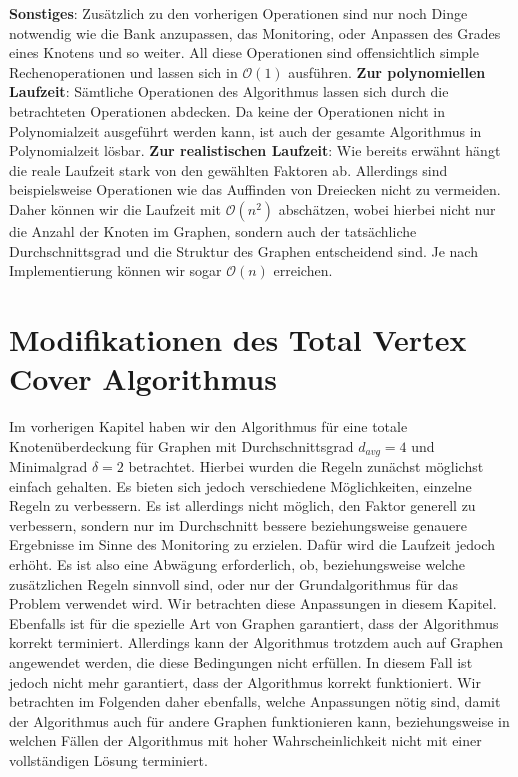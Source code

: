 \documentclass[12pt,onecolumn, notitlepage]{scrartcl}
\begin{document}
\textbf{Sonstiges}: Zusätzlich zu den vorherigen Operationen sind nur noch Dinge notwendig wie die Bank anzupassen, das Monitoring, oder Anpassen des Grades eines Knotens und so weiter. All diese Operationen sind offensichtlich simple Rechenoperationen und lassen sich in $\mathcal O(1)$ ausführen.\newline \newline
\textbf{Zur polynomiellen Laufzeit}: Sämtliche Operationen des Algorithmus lassen sich durch die betrachteten Operationen abdecken. Da keine der Operationen nicht in Polynomialzeit ausgeführt werden kann, ist auch der gesamte Algorithmus in Polynomialzeit lösbar. \newline
\textbf{Zur realistischen Laufzeit}: Wie bereits erwähnt hängt die reale Laufzeit stark von den gewählten Faktoren ab. Allerdings sind beispielsweise Operationen wie das Auffinden von Dreiecken nicht zu vermeiden. Daher können wir die Laufzeit mit $\mathcal O(n^2)$ abschätzen, wobei hierbei nicht nur die Anzahl der Knoten im Graphen, sondern auch der tatsächliche Durchschnittsgrad und die Struktur des Graphen entscheidend sind. Je nach Implementierung können wir sogar $\mathcal O(n)$ erreichen. \newline
\section{Modifikationen des Total Vertex Cover Algorithmus}\label{sec:Op}
Im vorherigen Kapitel haben wir den Algorithmus für eine totale Knotenüberdeckung für Graphen mit Durchschnittsgrad $d_{avg} = 4$ und Minimalgrad $\delta = 2$ betrachtet. Hierbei wurden die Regeln zunächst möglichst einfach gehalten. Es bieten sich jedoch verschiedene Möglichkeiten, einzelne Regeln zu verbessern. Es ist allerdings nicht möglich, den Faktor generell zu verbessern, sondern nur im Durchschnitt bessere beziehungsweise genauere Ergebnisse im Sinne des Monitoring zu erzielen. Dafür wird die Laufzeit jedoch erhöht. Es ist also eine Abwägung erforderlich, ob, beziehungsweise welche zusätzlichen Regeln sinnvoll sind, oder nur der Grundalgorithmus für das Problem verwendet wird. Wir betrachten diese Anpassungen in diesem Kapitel. Ebenfalls ist für die spezielle Art von Graphen garantiert, dass der Algorithmus korrekt terminiert. Allerdings kann der Algorithmus trotzdem auch auf Graphen angewendet werden, die diese Bedingungen nicht erfüllen. In diesem Fall ist jedoch nicht mehr garantiert, dass der Algorithmus korrekt funktioniert. Wir betrachten im Folgenden daher ebenfalls, welche Anpassungen nötig sind, damit der Algorithmus auch für andere Graphen funktionieren kann, beziehungsweise in welchen Fällen der Algorithmus mit hoher Wahrscheinlichkeit nicht mit einer vollständigen Lösung terminiert. \newline
\end{document}
